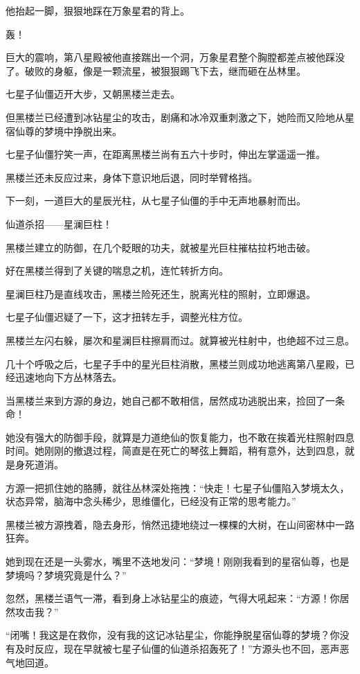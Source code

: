\begin{this_body}
他抬起一脚，狠狠地踩在万象星君的背上。

轰！

巨大的震响，第八星殿被他直接踹出一个洞，万象星君整个胸膛都差点被他踩没了。破败的身躯，像是一颗流星，被狠狠踢飞下去，继而砸在丛林里。

七星子仙僵迈开大步，又朝黑楼兰走去。

但黑楼兰已经遭到冰钻星尘的攻击，剧痛和冰冷双重刺激之下，她险而又险地从星宿仙尊的梦境中挣脱出来。

七星子仙僵狞笑一声，在距离黑楼兰尚有五六十步时，伸出左掌遥遥一推。

黑楼兰还未反应过来，身体下意识地后退，同时举臂格挡。

下一刻，一道巨大的星辰光柱，从七星子仙僵的手中无声地暴射而出。

仙道杀招——星澜巨柱！

黑楼兰建立的防御，在几个眨眼的功夫，就被星光巨柱摧枯拉朽地击破。

好在黑楼兰得到了关键的喘息之机，连忙转折方向。

星澜巨柱乃是直线攻击，黑楼兰险死还生，脱离光柱的照射，立即爆退。

七星子仙僵迟疑了一下，这才扭转左手，调整光柱方位。

黑楼兰左闪右躲，屡次和星澜巨柱擦肩而过。就算被光柱射中，也绝超不过三息。

几十个呼吸之后，七星子手中的星光巨柱消散，黑楼兰则成功地逃离第八星殿，已经迅速地向下方丛林落去。

当黑楼兰来到方源的身边，她自己都不敢相信，居然成功逃脱出来，捡回了一条命！

她没有强大的防御手段，就算是力道绝仙的恢复能力，也不敢在挨着光柱照射四息时间。她刚刚的撤退过程，简直是在死亡的琴弦上舞蹈，稍有意外，达到四息，就是身死道消。

方源一把抓住她的胳膊，就往丛林深处拖拽：“快走！七星子仙僵陷入梦境太久，状态异常，脑海中念头稀少，思维僵化，已经没有正常的思考能力。”

黑楼兰被方源拽着，隐去身形，悄然迅捷地绕过一棵棵的大树，在山间密林中一路狂奔。

她到现在还是一头雾水，嘴里不迭地发问：“梦境！刚刚我看到的星宿仙尊，也是梦境吗？梦境究竟是什么？”

忽然，黑楼兰语气一滞，看到身上冰钻星尘的痕迹，气得大吼起来：“方源！你居然攻击我？”

“闭嘴！我这是在救你，没有我的这记冰钻星尘，你能挣脱星宿仙尊的梦境？你没有及时反应，现在早就被七星子仙僵的仙道杀招轰死了！”方源头也不回，恶声恶气地回道。


\end{this_body}
